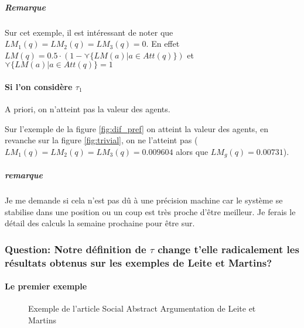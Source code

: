 \documentclass[12pt]{article}
\theoremstyle{defi}
\theoremstyle{not}
\theoremstyle{prob}
\begin{document}
          \subparagraph{Remarque\\}
            Sur cet exemple, il est intéressant de noter que $LM_1(q) = LM_2(q) = LM_3(q) = 0$.
            En effet $LM(q) = 0.5 \cdot (1 - \curlyvee \{LM(a) | a\in Att(q)\})$ et $\curlyvee \{LM(a) | a\in Att(q)\} = 1$


        \paragraph{Si l'on considère $\tau_1$\\}
          A priori, on n'atteint pas la valeur des agents.

          Sur l'exemple de la figure \ref{fig:dif_pref} on atteint la valeur des agents, en revanche sur la figure \ref{fig:trivial}, on ne l'atteint pas ($LM_1(q) = LM_2(q) = LM_3(q) = 0.009604$ alors que $LM_g(q) = 0.00731$).
\color{red}
          \subparagraph{remarque\\} Je me demande si cela n'est pas dû à une précision machine car le système se stabilise dans une position ou un coup est très proche d'être meilleur.
            Je ferais le détail des calculs la semaine prochaine pour être sur.
\color{black}
      \subsubsection{Question: Notre définition de $\tau$ change t'elle radicalement les résultats obtenus sur les exemples de Leite et Martins?}

        \paragraph{Le premier exemple\\}

          \begin{figure}
            \centering
            \caption{Exemple de l'article Social Abstract Argumentation de Leite et Martins}
            \label{fig:LM_example}
          \end{figure}
\end{document}
